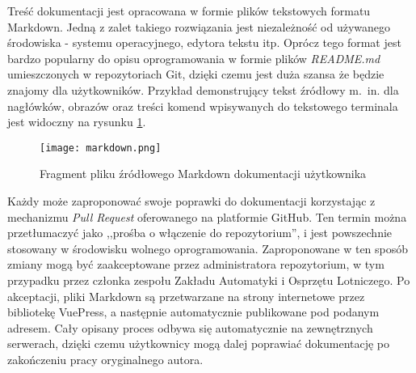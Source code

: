 Treść dokumentacji jest opracowana w formie plików tekstowych formatu Markdown\cite{rfc7763}. Jedną z zalet takiego rozwiązania jest niezależność od używanego środowiska - systemu operacyjnego, edytora tekstu itp. Oprócz tego format jest bardzo popularny do opisu oprogramowania w formie plików \emph{README.md} umieszczonych w repozytoriach Git, dzięki czemu jest duża szansa że będzie znajomy dla użytkowników. Przykład demonstrujący tekst źródłowy m.~in. dla nagłówków, obrazów oraz treści komend wpisywanych do tekstowego terminala jest widoczny na rysunku \ref{fig:markdown}.

\begin{figure}[!h]
    \caption{Fragment pliku źródłowego Markdown dokumentacji użytkownika}
    \label{fig:markdown}
    \centering \texttt{[image: markdown.png]}
\end{figure}

Każdy może zaproponować swoje poprawki do dokumentacji korzystając z mechanizmu \emph{Pull Request} oferowanego na platformie GitHub\cite{soft:github}. Ten termin można przetłumaczyć jako ,,prośba o włączenie do repozytorium'', i jest powszechnie stosowany w środowisku wolnego oprogramowania. Zaproponowane w ten sposób zmiany mogą być zaakceptowane przez administratora repozytorium, w tym przypadku przez członka zespołu Zakładu Automatyki i Osprzętu Lotniczego. Po akceptacji, pliki Markdown są przetwarzane na strony internetowe przez bibliotekę VuePress\cite{soft:vuepress}, a następnie automatycznie publikowane pod podanym adresem. Cały opisany proces odbywa się automatycznie na zewnętrznych serwerach, dzięki czemu użytkownicy mogą dalej poprawiać dokumentację po zakończeniu pracy oryginalnego autora.
